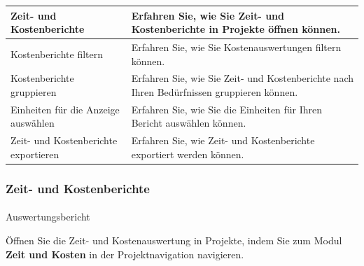 \documentclass[
  letterpaper,
  DIV=11,
  numbers=noendperiod]{scrreprt}
\makeatletter
\let\oldparagraph\paragraph
\renewcommand{\paragraph}{
    \@ifstar
      \xxxParagraphStar
      \xxxParagraphNoStar
  }
\newcommand{\xxxParagraphStar}[1]{\oldparagraph*{#1}\mbox{}}
\newcommand{\xxxParagraphNoStar}[1]{\oldparagraph{#1}\mbox{}}
\makeatother
\begin{document}
\begin{longtable}[]{@{}
  >{\raggedright\arraybackslash}p{}
  >{\raggedright\arraybackslash}p{}@{}}
\toprule\noalign{}
\begin{minipage}[b]{\linewidth}\raggedright
Zeit- und Kostenberichte
\end{minipage} & \begin{minipage}[b]{\linewidth}\raggedright
Erfahren Sie, wie Sie Zeit- und Kostenberichte in Projekte öffnen
können.
\end{minipage} \\
\midrule\noalign{}
\endhead
\bottomrule\noalign{}
\endlastfoot
Kostenberichte filtern & Erfahren Sie, wie Sie Kostenauswertungen
filtern können. \\
Kostenberichte gruppieren & Erfahren Sie, wie Sie Zeit- und
Kostenberichte nach Ihren Bedürfnissen gruppieren können. \\
Einheiten für die Anzeige auswählen & Erfahren Sie, wie Sie die
Einheiten für Ihren Bericht auswählen können. \\
Zeit- und Kostenberichte exportieren & Erfahren Sie, wie Zeit- und
Kostenberichte exportiert werden können. \\
\end{longtable}

\subsubsection{Zeit- und
Kostenberichte}\label{zeit--und-kostenberichte-1}

\paragraph{Auswertungsbericht}\label{auswertungsbericht}

Öffnen Sie die Zeit- und Kostenauswertung in Projekte, indem Sie zum
Modul \textbf{Zeit und Kosten} in der Projektnavigation navigieren.
\end{document}
